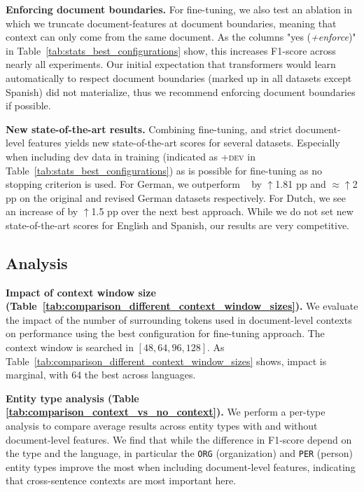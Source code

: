 \documentclass[11pt,a4paper]{article}
\begin{document}
\noindent
\textbf{Enforcing document boundaries.} For fine-tuning, we also test an ablation in which we truncate document-features at document boundaries, meaning that context can only come from the same document. As the columns "yes (\textit{+enforce})" in Table~\ref{tab:stats_best_configurations} show, this increases F1-score across nearly all experiments. Our initial expectation that transformers would learn automatically to respect document boundaries (marked up in all datasets except Spanish) did not materialize, thus we recommend enforcing document boundaries if possible.

\noindent 
\textbf{New state-of-the-art results.} 
Combining fine-tuning, and strict document-level features yields new state-of-the-art scores for several datasets. Especially when including dev data in training (indicated as \textsc{+dev} in Table~\ref{tab:stats_best_configurations}) as is possible for fine-tuning as no stopping criterion is used. For German, we outperform ~\cite{yu-etal-2020-named} by $\uparrow$1.81 pp and $\approx \uparrow$2 pp on the original and revised German datasets respectively. For Dutch, we see an increase of by $\uparrow$1.5 pp over the next best approach. While we do not set new state-of-the-art scores for English and Spanish, our results are very competitive. 











\subsection{Analysis}
\vspace{-1mm}
\noindent
\textbf{Impact of context window size (Table~\ref{tab:comparison_different_context_window_sizes}).}
We evaluate the impact of the number of surrounding tokens used in document-level contexts on
performance using the best configuration for fine-tuning approach. The context window is searched in $[48, 64, 96, 128]$. As Table~\ref{tab:comparison_different_context_window_sizes} shows, impact is marginal, with 64 the best across languages. 

\noindent
\textbf{Entity type analysis (Table \ref{tab:comparison_context_vs_no_context}).}
We perform a per-type analysis to compare average results across entity types with and without document-level features. We find that while the difference in F1-score depend on the type and the language, in particular the 
{\tt ORG} (organization) and {\tt PER} (person) entity types improve the most when including document-level features, indicating that cross-sentence contexts are most important here.
\end{document}
